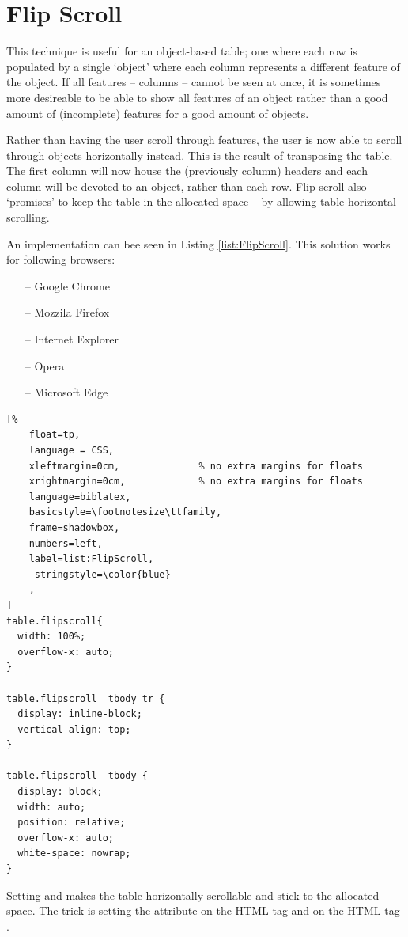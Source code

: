  
\section{Flip Scroll}
This technique is useful for an object-based table; one where each row
is populated by a single `object' where each column represents a
different feature of the object. If all features -- columns -- cannot
be seen at once, it is sometimes more desireable to be able to show
all features of an object rather than a good amount of (incomplete)
features for a good amount of objects.
\newline

Rather than having the user scroll through features, the user is now
able to scroll through objects horizontally instead. This is the
result of transposing the table. The first column will now house the
(previously column) headers and each column will be devoted to an
object, rather than each row. Flip scroll also `promises' to keep the 
table in the allocated space -- by allowing table horizontal scrolling.

An implementation can bee seen in Listing \ref{list:FlipScroll}. This 
solution works for following browsers:
\begin{itemize}
    \item[--] Google Chrome
    \item[--] Mozzila Firefox
    \item[--] Internet Explorer
    \item[--] Opera
    \item[--] Microsoft Edge
\end{itemize}

\begin{lstlisting}[%
    float=tp,
    language = CSS,
    xleftmargin=0cm,              % no extra margins for floats
    xrightmargin=0cm,             % no extra margins for floats
    language=biblatex,
    basicstyle=\footnotesize\ttfamily,
    frame=shadowbox,
    numbers=left,
    label=list:FlipScroll,
     stringstyle=\color{blue}
    ,
]
table.flipscroll{
  width: 100%;
  overflow-x: auto;
}
  
table.flipscroll  tbody tr { 
  display: inline-block; 
  vertical-align: top; 
}
  
table.flipscroll  tbody { 
  display: block; 
  width: auto; 
  position: relative; 
  overflow-x: auto; 
  white-space: nowrap; 
}
\end{lstlisting}

Setting  and  makes the
table horizontally scrollable and stick to the allocated space. The trick 
is setting the attribute  on the 
 HTML tag and  on the
 HTML tag \parencite{FS}.

